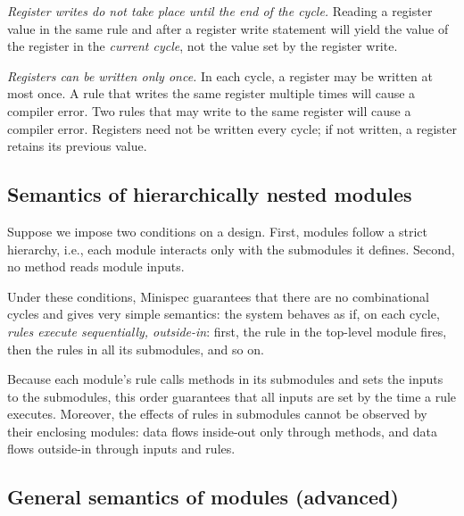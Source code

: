 \emph{Register writes do not take place until the end of the cycle.}
Reading a register value in the same rule and after a register write statement
will yield the value of the register in the  \emph{current cycle},
not the value set by the register write.

\emph{Registers can be written only once.}
In each cycle, a register may be written at most once.
A rule that writes the same register multiple times will cause a compiler error.
Two rules that may write to the same register will cause a compiler error.
Registers need not be written every cycle; if not written, a register retains its previous value.


\subsection{Semantics of hierarchically nested modules}
\label{sec:basicmodsemantics}

Suppose we impose two conditions on a design.
First, modules follow a strict hierarchy,
i.e., each module interacts only with the submodules it defines.
Second, no method reads module inputs.

Under these conditions, Minispec guarantees that there are no combinational cycles and gives very simple semantics:
the system behaves as if, on each cycle, \emph{rules execute sequentially, outside-in}:
first, the rule in the top-level module fires,
then the rules in all its submodules, and so on.

Because each module's rule calls methods in its submodules and sets the inputs to the submodules,
this order guarantees that all inputs are set by the time a rule executes.
Moreover, the effects of rules in submodules cannot be observed
by their enclosing modules: data flows inside-out only through methods,
and data flows outside-in through inputs and rules.

\subsection{General semantics of modules (advanced)}
\label{sec:generalmodsemantics}

